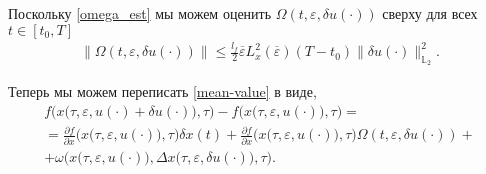 \documentclass[../main.tex]{subfiles}
\begin{document}
Поскольку \eqref{omega_est} мы можем оценить $\Omega(t,\varepsilon, \delta u(\cdot)) $ сверху для всех $t \in [t_0, T]$
\begin{gather}
 \| \Omega(t,\varepsilon, \delta u(\cdot))\| \leqslant \frac{l_f}{2} \overline{\varepsilon} L_x^2(\overline{\varepsilon})(T-t_0)\|\delta u(\cdot)\|_{\mathbb{L}_2}^2.
\end{gather}

Теперь мы можем переписать \eqref{mean-value} в виде, 
\begin{gather*}
 f\Big(x\big(\tau,\varepsilon, u(\cdot) + \delta u(\cdot)\big),\tau\Big) -
 f\Big(x\big(\tau,\varepsilon, u(\cdot)\big),\tau\Big) = \\ =
 \frac{\partial f}{\partial x} \Big(x\big(\tau,\varepsilon, u(\cdot)\big), \tau\Big) \delta x(t) + 
 \frac{\partial f}{\partial x} \Big(x\big(\tau,\varepsilon, u(\cdot)\big), \tau\Big) \Omega(t,\varepsilon, \delta u(\cdot))
 + \\ + 
 \omega\Big(x\big(\tau,\varepsilon, u(\cdot)\big),\Delta x\big(\tau, \varepsilon, \delta u(\cdot)\big),\tau\Big).
\end{gather*}
\end{document}
